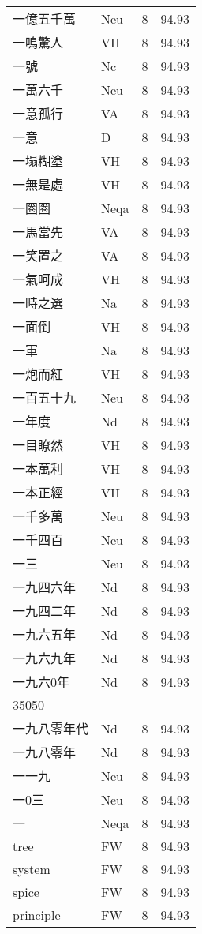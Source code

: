 \documentclass[twocolumn]{book}
\begin{document}
\begin{supertabular}{llrr}
一億五千萬 & Neu & 8 &  94.93\\
一鳴驚人 & VH & 8 &  94.93\\
一號 & Nc & 8 &  94.93\\
一萬六千 & Neu & 8 &  94.93\\
一意孤行 & VA & 8 &  94.93\\
一意 & D & 8 &  94.93\\
一塌糊塗 & VH & 8 &  94.93\\
一無是處 & VH & 8 &  94.93\\
一圈圈 & Neqa & 8 &  94.93\\
一馬當先 & VA & 8 &  94.93\\
一笑置之 & VA & 8 &  94.93\\
一氣呵成 & VH & 8 &  94.93\\
一時之選 & Na & 8 &  94.93\\
一面倒 & VH & 8 &  94.93\\
一軍 & Na & 8 &  94.93\\
一炮而紅 & VH & 8 &  94.93\\
一百五十九 & Neu & 8 &  94.93\\
一年度 & Nd & 8 &  94.93\\
一目瞭然 & VH & 8 &  94.93\\
一本萬利 & VH & 8 &  94.93\\
一本正經 & VH & 8 &  94.93\\
一千多萬 & Neu & 8 &  94.93\\
一千四百 & Neu & 8 &  94.93\\
一三 & Neu & 8 &  94.93\\
一九四六年 & Nd & 8 &  94.93\\
一九四二年 & Nd & 8 &  94.93\\
一九六五年 & Nd & 8 &  94.93\\
一九六九年 & Nd & 8 &  94.93\\
一九六0年 & Nd & 8 &  94.93\\
35050\\
一九八零年代 & Nd & 8 &  94.93\\
一九八零年 & Nd & 8 &  94.93\\
一一九 & Neu & 8 &  94.93\\
一0三 & Neu & 8 &  94.93\\
一 & Neqa & 8 &  94.93\\
tree & FW & 8 &  94.93\\
system & FW & 8 &  94.93\\
spice & FW & 8 &  94.93\\
principle & FW & 8 &  94.93\\

\end{supertabular}
\end{document}

